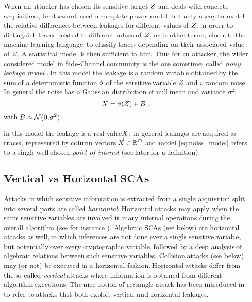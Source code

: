 When an attacker has chosen its sensitive target $Z$ and deals with concrete acquisitions, he does not need a complete power model, but only  a way to model the relative differences between leakages for different values of $Z$, in order to distinguish traces related to different values of $Z$, or in other terms, closer to the machine learning language, to classify traces depending on their associated value of $Z$. A statistical model is then sufficient to him. Thus for an attacker, the wider considered model in Side-Channel community is the one sometimes called \emph{noisy leakage model} \cite{chari1999towards}. In this model the leakage is a random variable obtained by the sum of a deterministic function $\phi$ of the sensitive variable $Z$ and a random noise. In general the noise has a Gaussian distribution of null mean and variance $\sigma^2$:
\begin{equation}\label{eq:noise_model}
X = \phi(Z) + B \mbox{ ,}
\end{equation}
with $B \approx \mathcal{N}(0,\sigma^2)$.
\begin{remark}
in this model the leakage is a real value$ X$. In general leakages are acquired as traces, 
represented by column vectors $\vec{X}\in\mathbb{R}^D$ and model \eqref{eq:noise_model} refers to a single well-chosen \emph{point of interest} (see later for a definition).
\end{remark}

\subsection{Vertical vs Horizontal SCAs}
Attacks in which sensitive information
is extracted from a single acquisition split into several parts are called \emph{horizontal}. Horizontal attacks may apply when the same sensitive variables are involved in many internal operations during the overall algorithm (see for instance \cite{battistello2016horizontal}). Algebraic SCAs (see below) are horizontal attacks as well, in which inferences are not done over a single sensitive variable, but potentially over every cryptographic variable, followed by a deep analysis of algebraic relations between such sensitive variables. Collision attacks (see below) may (or not) be executed in a horizontal fashion. Horizontal attacks differ from the so-called \emph{vertical} attacks where information is obtained from different algorithm executions. The nice notion of rectangle attack has been introduced in \cite{bauer2013horizontal} to refer to attacks that both exploit vertical and horizontal leakages.

